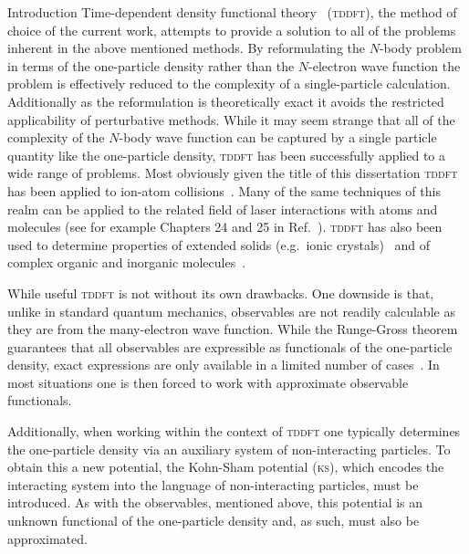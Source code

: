 \documentclass[a5paper, 9 pt]{extreport}
\begin{document}
\begin{chapter}{Introduction \label{chap:intro}}
   Time-dependent density functional theory~\cite{tddft, ullrich} (\textsc{tddft}), the method of choice
   of the current work, attempts to provide a solution to all  of the problems inherent in the above
   mentioned methods. By reformulating the $N$-body problem in terms of the one-particle density rather
   than the $N$-electron wave function the problem is effectively reduced to the complexity of a
   single-particle calculation. Additionally as the reformulation is theoretically exact it avoids the
   restricted applicability of perturbative methods. While it may seem strange that all of the
   complexity of the $N$-body wave function can be captured by a single particle quantity like the
   one-particle density, \textsc{tddft} has been successfully applied to a wide range of problems. Most
   obviously given the title of this dissertation \textsc{tddft} has been applied to ion-atom
   collisions~\cite{bgm-rev}. Many of the same techniques of this realm can be applied to the related
   field of laser interactions with atoms and molecules (see for example Chapters 24 and 25 in
   Ref.~\cite{tddft}). \textsc{tddft} has also been used to determine properties of extended solids
   (e.g.\ ionic crystals)~\cite{extRev} and of complex organic and inorganic molecules~\cite{qcRev}.

   While useful \textsc{tddft} is not without its own drawbacks. One downside is that, unlike in
   standard quantum mechanics, observables are not readily calculable as they are from the many-electron
   wave function. While the Runge-Gross theorem~\cite{rgt} guarantees that all observables are
   expressible as functionals of the one-particle density, exact expressions are only available in a
   limited number of cases~\cite{obs_exac}. In most situations one is then forced to work with
   approximate observable functionals.

   Additionally, when working within the context of \textsc{tddft} one typically determines the
   one-particle density via an auxiliary system of non-interacting particles. To obtain this a new
   potential, the Kohn-Sham potential (\textsc{ks}), which encodes the interacting system into the
   language of non-interacting particles, must be introduced. As with the observables, mentioned above,
   this potential is an unknown functional of the one-particle density and, as such, must also be
   approximated.


\end{chapter}
\end{document}

